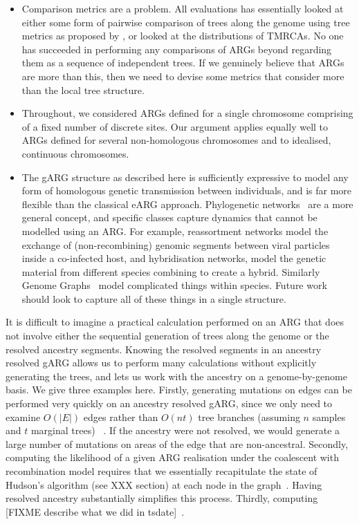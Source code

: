 \documentclass{article}
\begin{document}
\begin{itemize}
\item Comparison metrics are a problem. All evaluations has essentially
looked at either some form of pairwise comparison of trees along the genome
using tree metrics as proposed by \citet{kuhner2015assessing},
or looked at the distributions of TMRCAs. No
one has succeeded in performing any comparisons of ARGs beyond
regarding them as a sequence of independent trees. If we genuinely believe
that ARGs are more than this, then we need to devise some metrics that
consider more than the local tree structure.

\item Throughout, we considered ARGs defined for a single chromosome comprising
of a fixed number of discrete sites. Our argument applies equally well to ARGs
defined for several non-homologous chromosomes \citep{fearnhead2003ancestral,
koskela2019robust} and to idealised, continuous chromosomes.

\item The gARG structure as described here is sufficiently expressive
to model any form of homologous genetic transmission between individuals,
and is far more flexible than the classical eARG approach.
Phylogenetic networks~\citep{huson2010phylogenetic} are a more
general concept, and specific classes capture dynamics that
cannot be modelled using an ARG. For example,
reassortment networks model the exchange of
(non-recombining) genomic segments between viral particles inside a co-infected host,
and hybridisation networks, model the genetic material from
different species combining to create a hybrid.
Similarly Genome Graphs~\cite{novak2017genome} model complicated things
within species. Future work should look to capture all of these things
in a single structure.

\end{itemize}


It is difficult to imagine a practical calculation performed on an
ARG that does not involve either the sequential generation of trees
along the genome or the resolved ancestry segments.
Knowing the resolved segments in an ancestry resolved gARG allows
us to perform many calculations without explicitly generating
the trees, and lets us work with the ancestry on a genome-by-genome
basis. We give three examples here. Firstly, generating mutations
on edges can be performed very quickly on an ancestry resolved
gARG, since we only need to examine $O(|E|)$ edges rather than
$O(nt)$ tree branches (assuming $n$ samples and $t$ marginal trees)
~\citep{baumdicker2021efficient}. If the ancestry were not resolved,
we would generate a large number of mutations on areas of the edge that
are non-ancestral. Secondly, computing the likelihood of a given
ARG realisation under the coalescent with recombination model
requires that we essentially recapitulate the state of Hudson's
algorithm (see XXX section) at each node in
the graph~\citep{baumdicker2021efficient}. Having resolved ancestry
substantially simplifies this process. Thirdly, computing
[FIXME describe what we did in tsdate]~\citep{wohns2022unified}.
\end{document}
